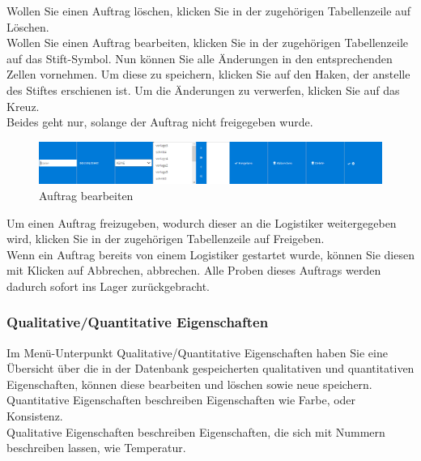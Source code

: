 \documentclass[enabledeprecatedfontcommands,fontsize=12pt,paper=a4,twoside]{scrartcl}
\begin{document}
Wollen Sie einen Auftrag löschen, klicken Sie in der zugehörigen Tabellenzeile auf Löschen. \\ 
Wollen Sie einen Auftrag bearbeiten, klicken Sie in der zugehörigen Tabellenzeile auf das Stift-Symbol. Nun können Sie alle Änderungen in den entsprechenden Zellen vornehmen. Um diese zu speichern, klicken Sie auf den Haken, der anstelle des Stiftes erschienen ist. Um die Änderungen zu verwerfen, klicken Sie auf das Kreuz. \\
Beides geht nur, solange der Auftrag nicht freigegeben wurde.  \\

\begin{figure}[h!]
\begin{center}
 \includegraphics[width=\textwidth]{screenshots/pk/auftragedit.png}
  \caption{Auftrag bearbeiten}
  \label{fig:boat2}
\end{center}
\end{figure}

Um einen Auftrag freizugeben, wodurch dieser an die Logistiker weitergegeben wird, klicken Sie in der zugehörigen Tabellenzeile auf Freigeben. \\

Wenn ein Auftrag bereits von einem Logistiker gestartet wurde, können Sie diesen mit Klicken auf Abbrechen, abbrechen. Alle Proben dieses Auftrags werden dadurch sofort ins Lager zurückgebracht. \\

\subsubsection{Qualitative/Quantitative Eigenschaften}

Im Menü-Unterpunkt Qualitative/Quantitative Eigenschaften haben Sie eine Übersicht über die in der Datenbank gespeicherten qualitativen und quantitativen Eigenschaften, können diese bearbeiten und löschen sowie neue speichern. \\

Quantitative Eigenschaften beschreiben Eigenschaften wie Farbe, oder Konsistenz. \\

Qualitative Eigenschaften beschreiben Eigenschaften, die sich mit Nummern beschreiben lassen, wie Temperatur.\\
\end{document}
